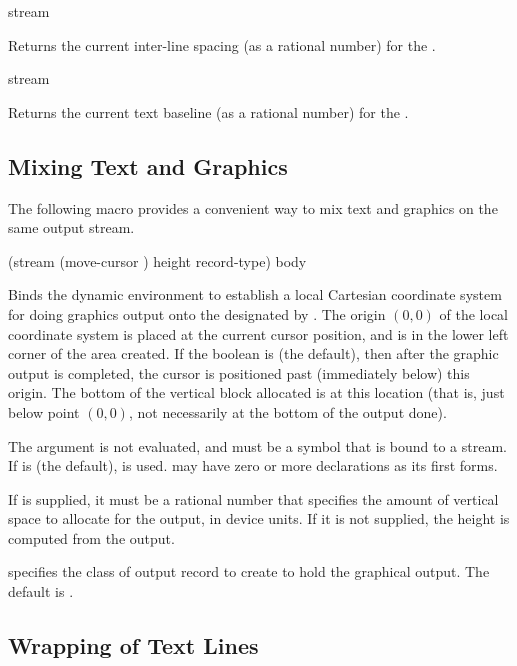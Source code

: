  {stream}

Returns the current inter-line spacing (as a rational number) for the
 .

 {stream}

Returns the current text baseline (as a rational number) for the  .


\subsection {Mixing Text and Graphics}

The following macro provides a convenient way to mix text and graphics on the
same output stream.

 {(\optional stream
                                     \key (move-cursor ) height record-type)
                                    \body body}

Binds the dynamic environment to establish a local Cartesian coordinate system
for doing graphics output onto the  designated by
.  The origin $(0,0)$ of the local coordinate system is placed at
the current cursor position, and is in the lower left corner of the area
created.  If the boolean  is  (the default), then
after the graphic output is completed, the cursor is positioned past
(immediately below) this origin.  The bottom of the vertical block allocated is
at this location (that is, just below point $(0,0)$, not necessarily at the
bottom of the output done).

The  argument is not evaluated, and must be a symbol that is bound
to a stream.  If  is  (the default),  is
used.   may have zero or more declarations as its first forms.

If  is supplied, it must be a rational number that specifies the
amount of vertical space to allocate for the output, in device units. If it is
not supplied, the height is computed from the output.

 specifies the class of output record to create to hold the
graphical output.  The default is .


\subsection {Wrapping of Text Lines}

